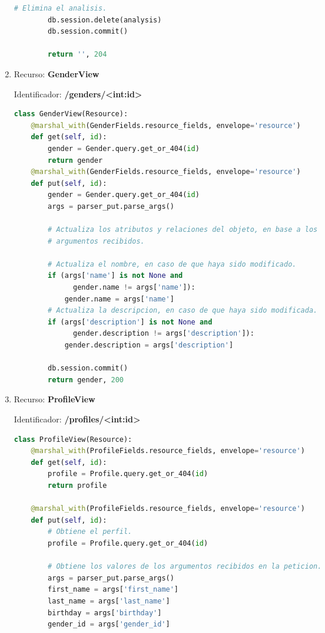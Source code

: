 \documentclass[a4paper,12pt]{article}
\begin{document}
\begin{enumerate}
\begin{lstlisting}[language=Python]
        # Elimina el analisis.
        db.session.delete(analysis)
        db.session.commit()

        return '', 204
\end{lstlisting}

\item Recurso: \textbf{GenderView} 

Identificador: \textbf{/genders/<int:id>}

\begin{lstlisting}[language=Python]
class GenderView(Resource):
    @marshal_with(GenderFields.resource_fields, envelope='resource')
    def get(self, id):
        gender = Gender.query.get_or_404(id)
        return gender
    @marshal_with(GenderFields.resource_fields, envelope='resource')
    def put(self, id):
        gender = Gender.query.get_or_404(id)
        args = parser_put.parse_args()

        # Actualiza los atributos y relaciones del objeto, en base a los
        # argumentos recibidos.

        # Actualiza el nombre, en caso de que haya sido modificado.
        if (args['name'] is not None and
              gender.name != args['name']):
            gender.name = args['name']
        # Actualiza la descripcion, en caso de que haya sido modificada.
        if (args['description'] is not None and
              gender.description != args['description']):
            gender.description = args['description']

        db.session.commit()
        return gender, 200
\end{lstlisting}	

\item Recurso: \textbf{ProfileView} 

Identificador: \textbf{/profiles/<int:id>}
\begin{lstlisting}[language=Python]
class ProfileView(Resource):
    @marshal_with(ProfileFields.resource_fields, envelope='resource')
    def get(self, id):
        profile = Profile.query.get_or_404(id)
        return profile

    @marshal_with(ProfileFields.resource_fields, envelope='resource')
    def put(self, id):
        # Obtiene el perfil.
        profile = Profile.query.get_or_404(id)

        # Obtiene los valores de los argumentos recibidos en la peticion.
        args = parser_put.parse_args()
        first_name = args['first_name']
        last_name = args['last_name']
        birthday = args['birthday']
        gender_id = args['gender_id']


\end{lstlisting}
\end{enumerate}
\end{document}
